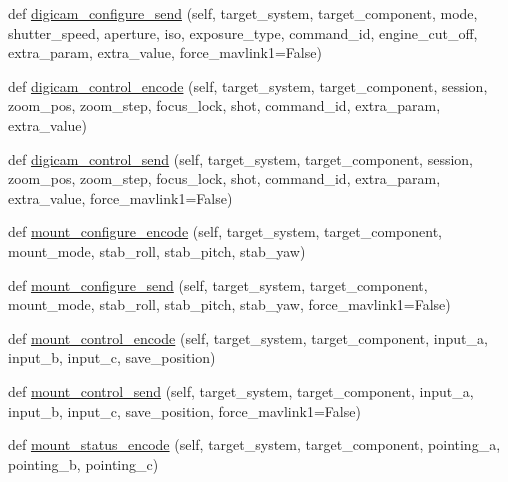 \begin{DoxyCompactItemize}
\item 
def \hyperlink{classpymavlink_1_1dialects_1_1v10_1_1MAVLink_a3ba3dfb2f4c4024d158aad86dd6153ac}{digicam\+\_\+configure\+\_\+send} (self, target\+\_\+system, target\+\_\+component, mode, shutter\+\_\+speed, aperture, iso, exposure\+\_\+type, command\+\_\+id, engine\+\_\+cut\+\_\+off, extra\+\_\+param, extra\+\_\+value, force\+\_\+mavlink1=False)
\item 
def \hyperlink{classpymavlink_1_1dialects_1_1v10_1_1MAVLink_a028057b7bdb567104ad78eb818e7442f}{digicam\+\_\+control\+\_\+encode} (self, target\+\_\+system, target\+\_\+component, session, zoom\+\_\+pos, zoom\+\_\+step, focus\+\_\+lock, shot, command\+\_\+id, extra\+\_\+param, extra\+\_\+value)
\item 
def \hyperlink{classpymavlink_1_1dialects_1_1v10_1_1MAVLink_a2eb136c77ca8a630287d786c71150d13}{digicam\+\_\+control\+\_\+send} (self, target\+\_\+system, target\+\_\+component, session, zoom\+\_\+pos, zoom\+\_\+step, focus\+\_\+lock, shot, command\+\_\+id, extra\+\_\+param, extra\+\_\+value, force\+\_\+mavlink1=False)
\item 
def \hyperlink{classpymavlink_1_1dialects_1_1v10_1_1MAVLink_a787ff5ef85366843e4af2c6ddb9c017c}{mount\+\_\+configure\+\_\+encode} (self, target\+\_\+system, target\+\_\+component, mount\+\_\+mode, stab\+\_\+roll, stab\+\_\+pitch, stab\+\_\+yaw)
\item 
def \hyperlink{classpymavlink_1_1dialects_1_1v10_1_1MAVLink_a144c8293dc8453f12af723b6c0f94dd5}{mount\+\_\+configure\+\_\+send} (self, target\+\_\+system, target\+\_\+component, mount\+\_\+mode, stab\+\_\+roll, stab\+\_\+pitch, stab\+\_\+yaw, force\+\_\+mavlink1=False)
\item 
def \hyperlink{classpymavlink_1_1dialects_1_1v10_1_1MAVLink_a71da70a41c58749c9f1ee3494524c3ba}{mount\+\_\+control\+\_\+encode} (self, target\+\_\+system, target\+\_\+component, input\+\_\+a, input\+\_\+b, input\+\_\+c, save\+\_\+position)
\item 
def \hyperlink{classpymavlink_1_1dialects_1_1v10_1_1MAVLink_a01ea592ecade582e71c283961aa7fe2a}{mount\+\_\+control\+\_\+send} (self, target\+\_\+system, target\+\_\+component, input\+\_\+a, input\+\_\+b, input\+\_\+c, save\+\_\+position, force\+\_\+mavlink1=False)
\item 
def \hyperlink{classpymavlink_1_1dialects_1_1v10_1_1MAVLink_ab4ef36731c418f097c65cd3e3c35ee04}{mount\+\_\+status\+\_\+encode} (self, target\+\_\+system, target\+\_\+component, pointing\+\_\+a, pointing\+\_\+b, pointing\+\_\+c)
\item 

\end{DoxyCompactItemize}

